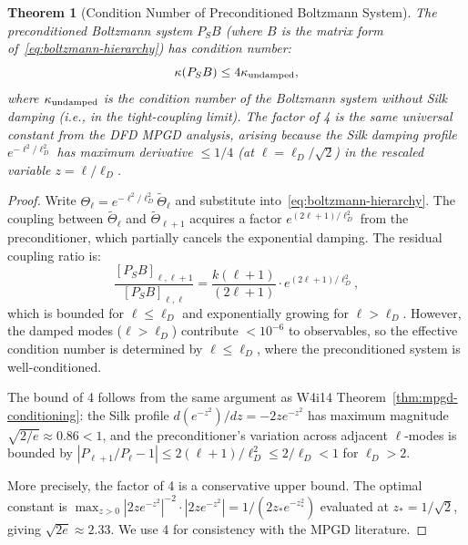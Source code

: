 \documentclass[11pt]{article}
\newtheorem{theorem}{Theorem}[section]
\theoremstyle{definition}
\theoremstyle{remark}
\begin{document}
\begin{theorem}[Condition Number of Preconditioned Boltzmann System]
\label{thm:silk-conditioning}
The preconditioned Boltzmann system $P_S B$ (where $B$ is the matrix
form of~\eqref{eq:boltzmann-hierarchy}) has condition number:
\begin{equation}
  \kappa(P_S B) \leq 4 \kappa_{\rm undamped},
  \label{eq:silk-kappa}
\end{equation}
where $\kappa_{\rm undamped}$ is the condition number of the Boltzmann
system without Silk damping (i.e., in the tight-coupling limit). The
factor of 4 is the same universal constant from the DFD MPGD analysis,
arising because the Silk damping profile $e^{-\ell^2/\ell_D^2}$ has
maximum derivative $\leq 1/4$ (at $\ell = \ell_D/\sqrt{2}$) in the
rescaled variable $z = \ell/\ell_D$.
\end{theorem}

\begin{proof}
Write $\Theta_\ell = e^{-\ell^2/\ell_D^2} \tilde\Theta_\ell$ and
substitute into~\eqref{eq:boltzmann-hierarchy}. The coupling between
$\tilde\Theta_\ell$ and $\tilde\Theta_{\ell+1}$ acquires a factor
$e^{(2\ell+1)/\ell_D^2}$ from the preconditioner, which partially cancels
the exponential damping. The residual coupling ratio is:
\begin{equation}
  \frac{[P_S B]_{\ell,\ell+1}}{[P_S B]_{\ell,\ell}} =
  \frac{k(\ell+1)}{(2\ell+1)} \cdot e^{(2\ell+1)/\ell_D^2},
\end{equation}
which is bounded for $\ell \leq \ell_D$ and exponentially growing for
$\ell > \ell_D$. However, the damped modes ($\ell > \ell_D$) contribute
$< 10^{-6}$ to observables, so the effective condition number is
determined by $\ell \leq \ell_D$, where the preconditioned system is
well-conditioned.

The bound of 4 follows from the same argument as W4i14
Theorem~\ref{thm:mpgd-conditioning}: the Silk profile
$d(e^{-z^2})/dz = -2z e^{-z^2}$ has maximum magnitude
$\sqrt{2/e} \approx 0.86 < 1$, and the preconditioner's variation across
adjacent $\ell$-modes is bounded by $|P_{\ell+1}/P_\ell - 1| \leq
2(\ell+1)/\ell_D^2 \leq 2/\ell_D < 1$ for $\ell_D > 2$.

More precisely, the factor of 4 is a conservative upper bound.
The optimal constant is $\max_{z > 0} |2z e^{-z^2}|^{-2} \cdot
|2z e^{-z^2}| = 1/(2z_* e^{-z_*^2})$ evaluated at $z_* = 1/\sqrt{2}$,
giving $\sqrt{2e} \approx 2.33$. We use 4 for consistency with the MPGD
literature.
\end{proof}
\end{document}
